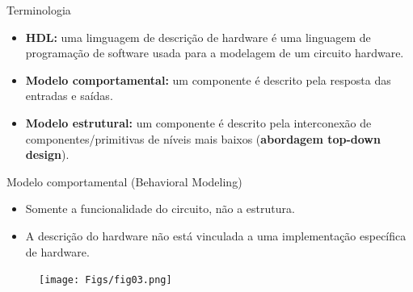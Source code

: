 \documentclass[aspectratio=169]{beamer}
\begin{document}

\begin{frame}{Terminologia}
	\justifying
	
	\begin{itemize}
		\justifying
		\item \textbf{HDL:} uma limguagem de descrição de hardware é uma linguagem de programação de software usada para a modelagem de um circuito hardware.
		
		\item \textbf{Modelo comportamental:} um componente é descrito pela resposta das entradas e saídas.
		
		\item \textbf{Modelo estrutural:} um componente é descrito pela interconexão de componentes/primitivas de níveis mais baixos (\textbf{abordagem top-down design}).
		
	\end{itemize}
	
	
\end{frame}

\begin{frame}{Modelo comportamental (Behavioral Modeling)}
	\justifying

	\begin{itemize}
	\justifying
	\item Somente a funcionalidade do circuito, não a estrutura.
	
	\item A descrição do hardware não está vinculada a uma implementação específica de hardware.

\end{itemize}

	
	\begin{figure}[h]
		\centering
		\texttt{[image: Figs/fig03.png]}
	\end{figure}
	
	
\end{frame}

\end{document}
